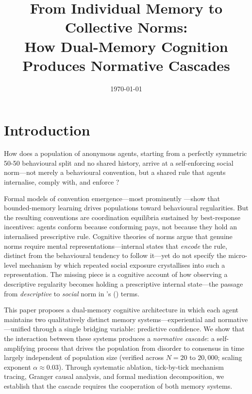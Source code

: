 \documentclass[11pt,a4paper]{article}
\title{From Individual Memory to Collective Norms:\\
How Dual-Memory Cognition Produces Normative Cascades}
\author{}
\date{\today}
\begin{document}
\maketitle
\tableofcontents
\newpage

\section{Introduction}
\label{sec:intro}

How does a population of anonymous agents, starting from a perfectly symmetric 50-50 behavioural split and no shared history, arrive at a self-enforcing social norm---not merely a behavioural convention, but a shared rule that agents internalise, comply with, and enforce \citep{bicchieri2006grammar}?

Formal models of convention emergence---most prominently \citet{young1993evolution}---show that bounded-memory learning drives populations toward behavioural regularities. But the resulting conventions are coordination equilibria sustained by best-response incentives: agents conform because conforming pays, not because they hold an internalised prescriptive rule. Cognitive theories of norms \citep{conte1995cognitive} argue that genuine norms require mental representations---internal states that \emph{encode} the rule, distinct from the behavioural tendency to follow it---yet do not specify the micro-level mechanism by which repeated social exposure crystallises into such a representation. The missing piece is a cognitive account of how observing a descriptive regularity becomes holding a prescriptive internal state---the passage from \emph{descriptive} to \emph{social} norm in \citeauthor{bicchieri2006grammar}'s (\citeyear{bicchieri2006grammar}) terms.

This paper proposes a dual-memory cognitive architecture in which each agent maintains two qualitatively distinct memory systems---experiential and normative---unified through a single bridging variable: predictive confidence. We show that the interaction between these systems produces a \emph{normative cascade}: a self-amplifying process that drives the population from disorder to consensus in time largely independent of population size (verified across $N = 20$ to $20{,}000$; scaling exponent $\alpha \approx 0.03$). Through systematic ablation, tick-by-tick mechanism tracing, Granger causal analysis, and formal mediation decomposition, we establish that the cascade requires the cooperation of both memory systems.
\end{document}
